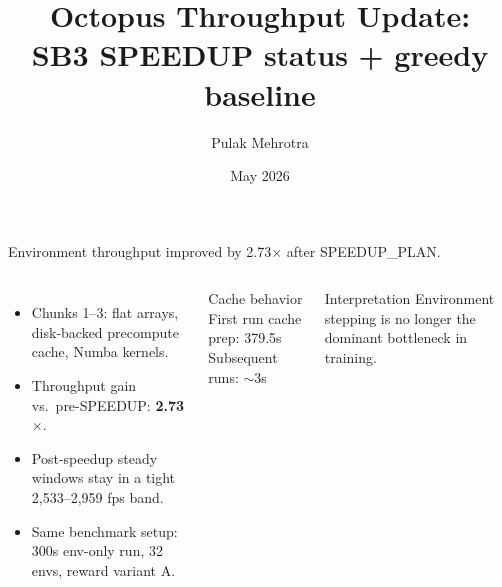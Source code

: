 \documentclass[11pt,aspectratio=43]{beamer}
\title{Octopus Throughput Update:\\SB3 SPEEDUP status + greedy baseline}
\author{Pulak Mehrotra}
\date{May 2026}
\begin{document}
\begin{frame}[plain]
  \titlepage
\end{frame}

\begin{frame}{Environment throughput improved by 2.73$\times$ after SPEEDUP\_PLAN.}

  \begin{columns}[T,onlytextwidth]
      \small

      \vspace{0.7em}
      \begin{itemize}
        \setlength{\itemsep}{0.55em}
        \item Chunks 1--3: flat arrays, disk-backed precompute cache, Numba kernels.
        \item Throughput gain vs.\ pre-SPEEDUP: \textbf{2.73$\times$}.
        \item Post-speedup steady windows stay in a tight 2,533--2,959 fps band.
        \item Same benchmark setup: 300s env-only run, 32 envs, reward variant A.
      \end{itemize}

      \vspace{0.6em}
      \begin{block}{Cache behavior}
        \small
        First run cache prep: 379.5s\\
        Subsequent runs: \(\sim\)3s
      \end{block}

      \vspace{0.45em}
      \begin{block}{Interpretation}
        \small
        Environment stepping is no longer the dominant bottleneck in training.
      \end{block}
  \end{columns}

\end{frame}
\end{document}
